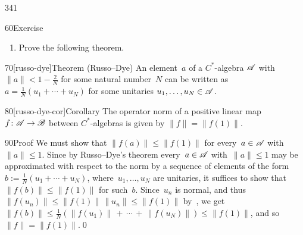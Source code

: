 \begin{parsec}{341}
\begin{point}{60}{Exercise}
\begin{enumerate}
\item
Prove the following theorem.
\end{enumerate}
\spacingfix%
\end{point}%
\begin{point}{70}[russo-dye]{Theorem (Russo--Dye)}%
An element~$a$ of a $C^*$-algebra $\mathscr{A}$
with $\|a\|< 1-\frac{2}{N}$
for some natural number~$N$
can be written as~$a=\frac{1}{N}(u_1+\dotsb + u_N)$
for some unitaries $u_1,\dotsc,u_N\in \mathscr{A}$.
\end{point}
\begin{point}{80}[russo-dye-cor]{Corollary}%
The operator norm of a positive
    linear map~$f\colon\mathscr{A}\to\mathscr{B}$ between
    $C^*$-algebras is given by  $\|f\|=\|f(1)\|$.
\begin{point}{90}{Proof}%
We must show that $\|f(a)\|\leq \|f(1)\|$
for every~$a\in\mathscr{A}$ with~$\|a\|\leq 1$.
Since by Russo--Dye's theorem 
every~$a\in\mathscr{A}$ with~$\|a\|\leq 1$ 
may be approximated with respect to the norm by a sequence
of elements of the form  $b:=\frac{1}{N}(u_1+\dotsb+u_N)$,
where~$u_1,\dotsc,u_N$ are unitaries,
it suffices to show that $\|f(b)\|\leq \|f(1)\|$
for such~$b$.
Since~$u_n$ is normal,
    and thus $\|f(u_n)\|\leq \|f(1)\|\,\|u_n\|\leq \|f(1)\|$
    by~,
    we get $\|f(b)\|\leq \frac{1}{N}(\|f(u_1)\|\,+\,\dotsb\,+\,\|f(u_N)\|)
    \leq \|f(1)\|$, and so $\|f\|=\|f(1)\|$.\qed
\end{point}
\end{point}
\end{parsec}

